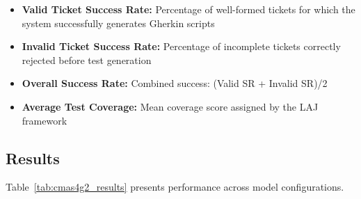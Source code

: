 \begin{itemize}[leftmargin=*]
    \item \textbf{Valid Ticket Success Rate:} Percentage of well-formed tickets for which the system successfully generates Gherkin scripts
    \item \textbf{Invalid Ticket Success Rate:} Percentage of incomplete tickets correctly rejected before test generation
    \item \textbf{Overall Success Rate:} Combined success: (Valid SR + Invalid SR)/2
    \item \textbf{Average Test Coverage:} Mean coverage score assigned by the LAJ framework
\end{itemize}

\subsection{Results}

Table~\ref{tab:cmas4g2_results} presents performance across model configurations.

\begin{table}[htbp]
\centering
\caption{CMAS4G2 Performance on 200-Ticket Kill Bill Benchmark. Values are mean$\pm$std across 5 runs.}
\label{tab:cmas4g2_results}
\end{table}

